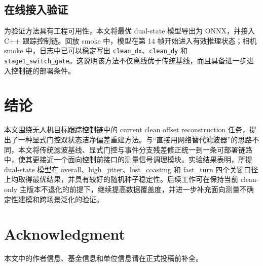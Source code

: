﻿\documentclass[lettersize,journal]{IEEEtran}
\begin{document}
\subsection{在线接入验证}
为验证方法具有工程可用性，本文将最优 dual-state 模型导出为 ONNX，并接入 C++ 跟踪控制链。回放 smoke 中，模型在第 14 帧开始进入有效推理状态；相机 smoke 中，日志中已可以稳定写出 \texttt{clean\_dx}、\texttt{clean\_dy} 和 \texttt{stage1\_switch\_gate}。这说明该方法不仅离线优于传统基线，而且具备进一步进入控制链的部署条件。

\section{结论}
本文围绕无人机目标跟踪控制链中的 current clean offset reconstruction 任务，提出了一种显式门控双状态洁净偏差重建方法。与“直接用网络替代滤波器”的思路不同，本文将传统滤波基线、显式门控与事件分支残差修正统一到一条可部署链路中，使其更接近一个面向控制前接口的测量信号调理模块。实验结果表明，所提 dual-state 模型在 overall、high\_jitter、lost\_coasting 和 fast\_turn 四个关键口径上均取得最优结果，并具有较好的随机种子稳定性。后续工作可在保持当前 clean-only 主版本不退化的前提下，继续提高数据覆盖度，并进一步补充面向测量不确定性建模和跨场景泛化的验证。

\section*{Acknowledgment}
本文中的作者信息、基金信息和单位信息请在正式投稿前补全。



\end{document}
